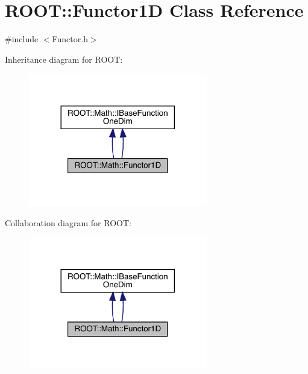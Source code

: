 \hypertarget{classROOT_1_1Math_1_1Functor1D}{}\section{R\+O\+OT\+:\+:Functor1D Class Reference}
\label{classROOT_1_1Math_1_1Functor1D}


{\ttfamily \#include $<$Functor.\+h$>$}



Inheritance diagram for R\+O\+OT\+:\nopagebreak
\begin{figure}[H]
\begin{center}
\leavevmode
\includegraphics[width=221pt]{d9/d89/classROOT_1_1Math_1_1Functor1D__inherit__graph}
\end{center}
\end{figure}


Collaboration diagram for R\+O\+OT\+:\nopagebreak
\begin{figure}[H]
\begin{center}
\leavevmode
\includegraphics[width=221pt]{d1/d6d/classROOT_1_1Math_1_1Functor1D__coll__graph}
\end{center}
\end{figure}
